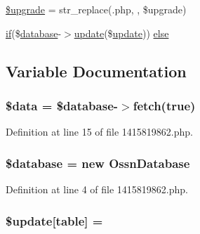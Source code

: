 \begin{DoxyCompactItemize}
\item 
\hyperlink{1415819862_8php_a9084097ce600d3cc7a79a20ecaea9906}{\$upgrade} = str\+\_\+replace(\textquotesingle{}.php\textquotesingle{}, \textquotesingle{}\textquotesingle{}, \$upgrade)
\item 
\hyperlink{jquery_8tokeninput_8js_ad8dd46a3cbc004569e34401e9e71771a}{if}(\$\hyperlink{ossn_8config_8db_8example_8php_a4e0ca996705612048240f76ff8d4da95}{database}-\/$>$\hyperlink{_chart_8_doughnut_8js_ad58a8121caa8678969d1ff32848a77c4}{update}(\$\hyperlink{_chart_8_doughnut_8js_ad58a8121caa8678969d1ff32848a77c4}{update})) \hyperlink{1415819862_8php_aa7c58ee9f19ec0c0f3a1951839273e79}{else}
\end{DoxyCompactItemize}


\subsection{Variable Documentation}
\subsubsection[{\texorpdfstring{\$data}{$data}}]{\setlength{\rightskip}{0pt plus 5cm}\${\bf data} = \${\bf database}-\/$>$fetch(true)}\hypertarget{1415819862_8php_a6efc15b5a2314dd4b5aaa556a375c6d6}{}\label{1415819862_8php_a6efc15b5a2314dd4b5aaa556a375c6d6}


Definition at line 15 of file 1415819862.\+php.

\subsubsection[{\texorpdfstring{\$database}{$database}}]{\setlength{\rightskip}{0pt plus 5cm}\${\bf database} = new {\bf Ossn\+Database}}\hypertarget{1415819862_8php_a7691c0162d89de0b6ba47edcd8ba8878}{}\label{1415819862_8php_a7691c0162d89de0b6ba47edcd8ba8878}


Definition at line 4 of file 1415819862.\+php.

\subsubsection[{\texorpdfstring{\$update}{$update}}]{\setlength{\rightskip}{0pt plus 5cm}\${\bf update}\mbox{[}\textquotesingle{}table\textquotesingle{}\mbox{]} = \textquotesingle{}}\hypertarget{1415819862_8php_aee7ba5985ddf023a93862ab77e9718f9}{}\label{1415819862_8php_aee7ba5985ddf023a93862ab77e9718f9}


